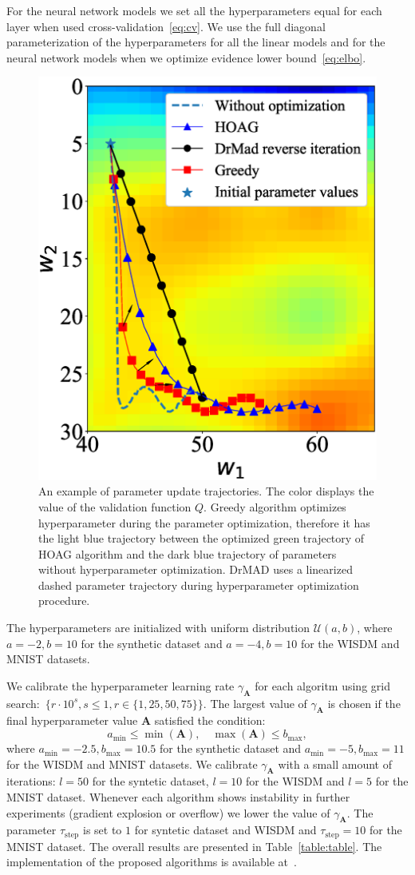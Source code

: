 \documentclass[smallcondensed]{svjour3}
\begin{document}
For the neural network models we set all the hyperparameters equal for each layer when used  cross-validation~\eqref{eq:cv}. We use the full diagonal parameterization of the hyperparameters for all the linear models and for the neural network models when we optimize evidence lower bound~\eqref{eq:elbo}.


\begin{figure}[tbh!]
    \centering
    \includegraphics[width=0.5\linewidth]{plots/Fig_traj2.eps}

    \caption{An example of parameter update trajectories. The color displays the value of the validation function $Q$. Greedy algorithm optimizes hyperparameter during the parameter optimization, therefore it has the light blue trajectory between the optimized green trajectory of HOAG algorithm and the dark blue trajectory of parameters without hyperparameter optimization. DrMAD uses a linearized dashed parameter trajectory during hyperparameter optimization procedure.  }
    \end{figure}


The hyperparameters are initialized with uniform distribution $\mathcal{U}(a,b)$,
where $a = -2, b = 10$ for the synthetic dataset and $a = -4, b = 10$  for the WISDM and MNIST datasets.

We calibrate the hyperparameter learning rate $\gamma_{\mathbf{A}}$  for each algoritm using grid search:~$\{r \cdot 10^{s}, s \leq 1, r \in \{1,25,50,75\}\}$. The largest value of $\gamma_{\mathbf{A}}$ is chosen if the final hyperparameter value $\mathbf{A}$ satisfied the condition:
\[
    a_\text{min} \leq  \min(\mathbf{A}), \quad \max(\mathbf{A}) \leq b_\text{max},
\] 
where $a_\text{min} = -2.5, b_\text{max}=10.5$ for the synthetic dataset and $a_\text{min} = -5, b_\text{max}=11$ for the WISDM and MNIST datasets. We calibrate $\gamma_\mathbf{A}$ with a small amount of iterations: $l=50$ for the syntetic dataset, $l=10$ for the WISDM and $l=5$ for the MNIST dataset. Whenever each algorithm shows instability in further experiments (gradient explosion or overflow) we lower the value of $\gamma_{\mathbf{A}}$. The parameter $\tau_\text{step}$ is set to $1$ for syntetic dataset and WISDM and  $\tau_\text{step}=10$ for the MNIST dataset.
The overall results are presented in Table~\ref{table:table}. The implementation of the proposed algorithms is available at~\cite{pyfos}.
\end{document}
